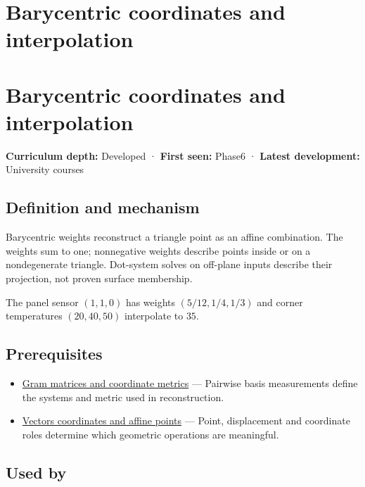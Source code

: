 \hypertarget{appendix-02b9d9a81dca}{}
\section*{Barycentric coordinates and interpolation}
\section{Barycentric coordinates and interpolation}\label{barycentric-coordinates-and-interpolation}

\textbf{Curriculum depth:} Developed · \textbf{First seen:} Phase6 · \textbf{Latest development:} University courses

\subsection{Definition and mechanism}\label{definition-and-mechanism}

Barycentric weights reconstruct a triangle point as an affine combination. The weights sum to one; nonnegative weights describe points inside or on a nondegenerate triangle. Dot-system solves on off-plane inputs describe their projection, not proven surface membership.

The panel sensor \((1,1,0)\) has weights \((5/12,1/4,1/3)\) and corner temperatures \((20,40,50)\) interpolate to \(35\).

\subsection{Prerequisites}\label{prerequisites}

\begin{itemize}
\tightlist
\item
  \hyperref[appendix-3b863809f82a]{Gram matrices and coordinate metrics} --- Pairwise basis measurements define the systems and metric used in reconstruction.
\item
  \hyperref[appendix-0659864c0aa3]{Vectors coordinates and affine points} --- Point, displacement and coordinate roles determine which geometric operations are meaningful.
\end{itemize}

\subsection{Used by}\label{used-by}

